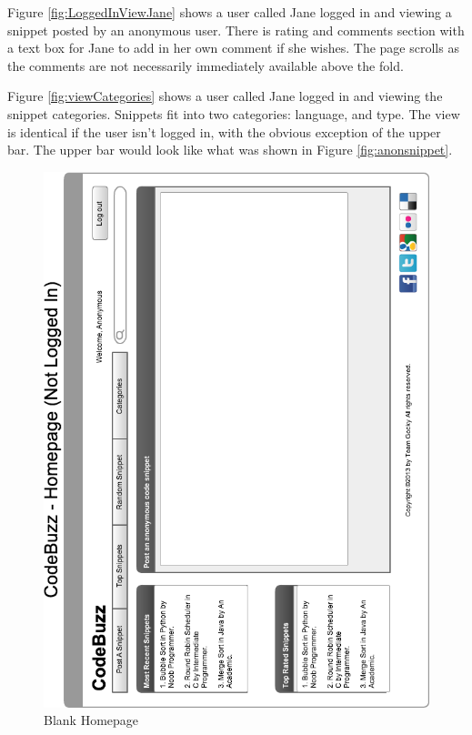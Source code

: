 \documentclass[11pt,a4paper]{article}
\begin{document}
Figure \ref{fig:LoggedInViewJane} shows a user called Jane logged in and viewing
a snippet posted by an anonymous user. There is rating and comments section
with a text box for Jane to add in her own comment if she wishes. The page
scrolls as the comments are not necessarily immediately available above the
fold.

Figure \ref{fig:viewCategories} shows a user called Jane logged in and viewing
the snippet categories. Snippets fit into two categories: language, and type.
The view is identical if the user isn't logged in, with the obvious exception
of the upper bar. The upper bar would look like what was shown in Figure
\ref{fig:anonsnippet}.

\begin{figure}
\includegraphics[width=\textwidth]{../imgs/InitialHomepageHorz.png}
\caption{Blank Homepage}
\label{fig:blankPage}
\end{figure}
\end{document}
